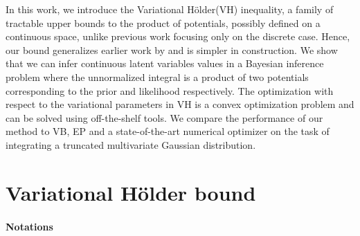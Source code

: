 \documentclass{article} %
\newcommand{\Holder}{H\"older\xspace}
\newcommand{\LSE}[3]{\bar{\mathbb{E}}_{#1}^{#2}\left[#3\right]}
\newcommand{\Expectation}[2]{\int{#2}d\nu(\Z)}
\def\Z{Z}
\begin{document}
In this work, we introduce the Variational \Holder (VH) inequality, a family of tractable upper bounds to the product
of potentials, possibly defined on a continuous space, unlike previous work focusing %
only on the discrete case. Hence, our bound generalizes earlier work by \citet{liu11d} and is simpler in construction.  
{We show that we can infer continuous latent variables values in a Bayesian inference problem where the unnormalized integral is a product of two potentials corresponding to the prior and likelihood respectively. The optimization with respect to the variational parameters in VH is a convex optimization problem and can be solved using off-the-shelf tools. We compare the performance of our method to VB, EP and a state-of-the-art numerical optimizer on the task of integrating a truncated multivariate Gaussian distribution.}



\section{Variational \Holder bound}
\label{sec:vh}


\paragraph{Notations}
\end{document}
